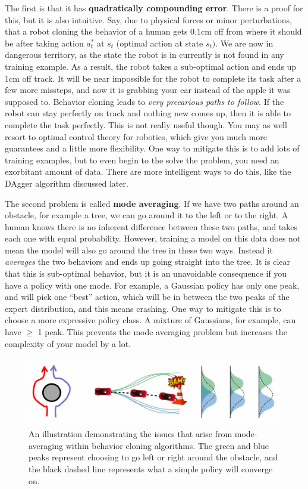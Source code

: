     The first is that it has \textbf{quadratically compounding error}. There is a proof for this, but it is also intuitive. Say, due to physical forces or minor perturbations, that a robot cloning the behavior of a human gets 0.1cm off from where it should be after taking action $a_t^\ast$ at $s_t$ (optimal action at state $s_t)$. We are now in dangerous territory, as the state the robot is in currently is not found in any training example. As a result, the robot takes a sub-optimal action and ends up 1cm off track. It will be near impossible for the robot to complete its task after a few more missteps, and now it is grabbing your ear instead of the apple it was supposed to. Behavior cloning leads to \textit{very precarious paths to follow}. If the robot can stay perfectly on track and nothing new comes up, then it is able to complete the task perfectly. This is not really useful though. You may as well resort to optimal control theory for robotics, which give you much more guarantees and a little more flexibility. One way to mitigate this is to add lots of training examples, but to even begin to the solve the problem, you need an exorbitant amount of data. There are more intelligent ways to do this, like the DAgger algorithm discussed later. 

    The second problem is called \textbf{mode averaging}. If we have two paths around an obstacle, for example a tree, we can go around it to the left or to the right. A human knows there is no inherent difference between these two paths, and takes each one with equal probability. However, training a model on this data does not mean the model will also go around the tree in these two ways. Instead it \textit{averages} the two behaviors and ends up going straight into the tree. It is clear that this is sub-optimal behavior, but it is an unavoidable consequence if you have a policy with one mode. For example, a Gaussian policy has only one peak, and will pick one ``best'' action, which will be in between the two peaks of the expert distribution, and this means crashing. One way to mitigate this is to choose a more expressive policy class. A mixture of Gaussians, for example, can have $\geq$ 1 peak. This prevents the mode averaging problem but increases the complexity of your model by a lot.

    \begin{figure}[H]
        \centering
        \includegraphics[width=0.9\linewidth]{rl/modeavg.png}
        \caption{An illustration demonstrating the issues that arise from mode-averaging within behavior cloning algorithms. The green and blue peaks represent choosing to go left or right around the obstacle, and the black dashed line represents what a simple policy will converge on.}
        \label{fig:modeavg}
    \end{figure}

